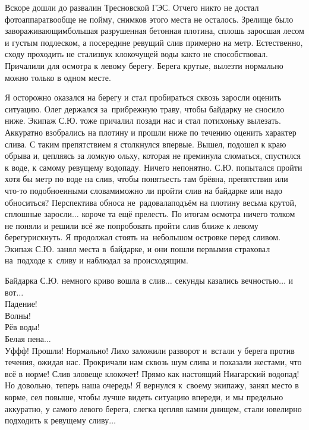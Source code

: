 Вскоре дошли до развалин Тресновской ГЭС. Отчего никто не достал фотоаппарат\mdash вообще не пойму, снимков этого места не осталось. Зрелище было завораживающим\mdash большая разрушенная бетонная плотина, сплошь заросшая лесом и густым подлеском, а посередине ревущий слив примерно на метр. Естественно, сходу проходить не стали\mdash звук клокочущей воды как\sdash то не способствовал. Причалили для осмотра к левому берегу. Берега крутые, вылезти нормально можно только в одном месте. 

Я осторожно оказался на берегу и стал пробираться сквозь заросли оценить ситуацию. Олег держался за~прибрежную траву, чтобы байдарку не сносило ниже. Экипаж С.Ю. тоже причалил позади нас и стал потихоньку вылезать. Аккуратно взобрались на плотину и прошли ниже по течению оценить характер слива. С таким препятствием я столкнулся впервые. Вышел, подошел к краю обрыва и, цепляясь за ломкую ольху, которая не преминула сломаться, спустился к воде, к самому ревущему водопаду. Ничего непонятно. С.Ю. попытался пройти хотя бы метр по воде на слив, чтобы понять\mdash есть там брёвна, препятствия или что-то подобное\mdash иными словами\mdash можно ли пройти слив на байдарке или надо обноситься? Перспектива обноса не~радовала\mdash подъём на плотину весьма крутой, сплошные заросли$\ldots$ короче та ещё прелесть. По итогам осмотра ничего толком не поняли и решили всё же попробовать пройти слив ближе к левому берегу\mdash рискнуть. Я продолжал стоять на~небольшом островке перед сливом. Экипаж С.Ю. занял места в~байдарке, и они пошли первыми\mdash я страховал на~подходе к~сливу и наблюдал за происходящим.

Байдарка С.Ю. немного криво вошла в слив$\ldots$ секунды казались вечностью$\ldots$ и вот$\ldots$\\
Падение!\\
{\hspace*{19mm} \large Волны!\\
\hspace*{40mm} \Large Рёв воды!\\
\hspace*{70mm} \LARGE Белая пена$\ldots$}\\
\noindent Уф\sdash ф\sdash ф! Прошли! Нормально! Лихо заложили разворот и~встали у берега против течения, ожидая нас. Прокричали нам сквозь шум слива и показали жестами, что всё в норме! Слив зловеще клокочет! Прямо как настоящий Ниагарский водопад! Но довольно, теперь наша очередь! Я вернулся к~своему экипажу, занял место в корме, сел повыше, чтобы лучше видеть ситуацию впереди, и мы предельно аккуратно, у самого левого берега, слегка цепляя камни днищем, стали ювелирно подходить к ревущему сливу$\ldots$
 
